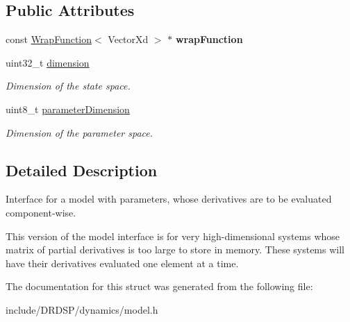 \subsection*{Public Attributes}
\begin{DoxyCompactItemize}
\item 
\hypertarget{struct_d_r_d_s_p_1_1_model_parameterized_c_w_a185304f801d2372b66f5f08f4458a684}{const \hyperlink{struct_d_r_d_s_p_1_1_wrap_function}{Wrap\-Function}$<$ Vector\-Xd $>$ $\ast$ {\bfseries wrap\-Function}}\label{struct_d_r_d_s_p_1_1_model_parameterized_c_w_a185304f801d2372b66f5f08f4458a684}

\item 
\hypertarget{struct_d_r_d_s_p_1_1_model_parameterized_c_w_ac840c2c4704f71998043ea2c27fa6b8b}{uint32\-\_\-t \hyperlink{struct_d_r_d_s_p_1_1_model_parameterized_c_w_ac840c2c4704f71998043ea2c27fa6b8b}{dimension}}\label{struct_d_r_d_s_p_1_1_model_parameterized_c_w_ac840c2c4704f71998043ea2c27fa6b8b}

\begin{DoxyCompactList}\small\item\em Dimension of the state space. \end{DoxyCompactList}\item 
\hypertarget{struct_d_r_d_s_p_1_1_model_parameterized_c_w_a618fb5f5113e0a04bec9cd2221f30b00}{uint8\-\_\-t \hyperlink{struct_d_r_d_s_p_1_1_model_parameterized_c_w_a618fb5f5113e0a04bec9cd2221f30b00}{parameter\-Dimension}}\label{struct_d_r_d_s_p_1_1_model_parameterized_c_w_a618fb5f5113e0a04bec9cd2221f30b00}

\begin{DoxyCompactList}\small\item\em Dimension of the parameter space. \end{DoxyCompactList}\end{DoxyCompactItemize}


\subsection{Detailed Description}
Interface for a model with parameters, whose derivatives are to be evaluated component-\/wise. 

This version of the model interface is for very high-\/dimensional systems whose matrix of partial derivatives is too large to store in memory. These systems will have their derivatives evaluated one element at a time. 

The documentation for this struct was generated from the following file\-:\begin{DoxyCompactItemize}
\item 
include/\-D\-R\-D\-S\-P/dynamics/model.\-h\end{DoxyCompactItemize}
